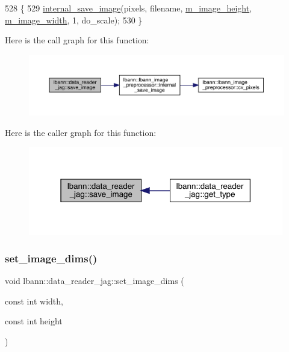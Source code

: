 \begin{DoxyCode}
528                                                                                      \{
529   \hyperlink{classlbann_1_1lbann__image__preprocessor_a3c4f4cc5c90233696566a35a62a1708c}{internal\_save\_image}(pixels, filename, \hyperlink{classlbann_1_1data__reader__jag_a6178d5dffd5e9bf7cf5703613cf9bd2e}{m\_image\_height}, 
      \hyperlink{classlbann_1_1data__reader__jag_a193a91f2aab9f6373a7b376ff183cd0e}{m\_image\_width}, 1, do\_scale);
530 \}
\end{DoxyCode}
Here is the call graph for this function\+:\nopagebreak
\begin{figure}[H]
\begin{center}
\leavevmode
\includegraphics[width=350pt]{classlbann_1_1data__reader__jag_a396e7456d926ae9045011e7f28284946_cgraph}
\end{center}
\end{figure}
Here is the caller graph for this function\+:\nopagebreak
\begin{figure}[H]
\begin{center}
\leavevmode
\includegraphics[width=316pt]{classlbann_1_1data__reader__jag_a396e7456d926ae9045011e7f28284946_icgraph}
\end{center}
\end{figure}
\mbox{\label{classlbann_1_1data__reader__jag_a7b76ea4a64b8072728eb1b41d5a62f47}} 
\subsubsection{\texorpdfstring{set\+\_\+image\+\_\+dims()}{set\_image\_dims()}}
{\footnotesize\ttfamily void lbann\+::data\+\_\+reader\+\_\+jag\+::set\+\_\+image\+\_\+dims (\begin{DoxyParamCaption}\item[{const int}]{width,  }\item[{const int}]{height }\end{DoxyParamCaption})}



